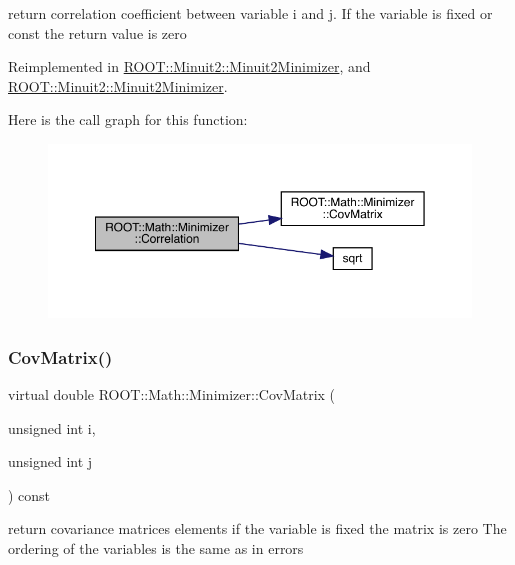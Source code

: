 return correlation coefficient between variable i and j. If the variable is fixed or const the return value is zero 

Reimplemented in \mbox{\hyperlink{classROOT_1_1Minuit2_1_1Minuit2Minimizer_a229e82025189e72b5a03cb4e3be19f4a}{R\+O\+O\+T\+::\+Minuit2\+::\+Minuit2\+Minimizer}}, and \mbox{\hyperlink{classROOT_1_1Minuit2_1_1Minuit2Minimizer_a229e82025189e72b5a03cb4e3be19f4a}{R\+O\+O\+T\+::\+Minuit2\+::\+Minuit2\+Minimizer}}.

Here is the call graph for this function\+:
\nopagebreak
\begin{figure}[H]
\begin{center}
\leavevmode
\includegraphics[width=350pt]{dc/dc4/classROOT_1_1Math_1_1Minimizer_a9ba2f4bc3c8c0e905f2c018e79809c0e_cgraph}
\end{center}
\end{figure}
\mbox{\label{classROOT_1_1Math_1_1Minimizer_a01b0ec371972dab12ca3b9c962d952f8}} 
\subsubsection{\texorpdfstring{CovMatrix()}{CovMatrix()}\hspace{0.1cm}{\footnotesize\ttfamily [1/2]}}
{\footnotesize\ttfamily virtual double R\+O\+O\+T\+::\+Math\+::\+Minimizer\+::\+Cov\+Matrix (\begin{DoxyParamCaption}\item[{unsigned int}]{i,  }\item[{unsigned int}]{j }\end{DoxyParamCaption}) const\hspace{0.3cm}{\ttfamily [pure virtual]}}

return covariance matrices elements if the variable is fixed the matrix is zero The ordering of the variables is the same as in errors 

